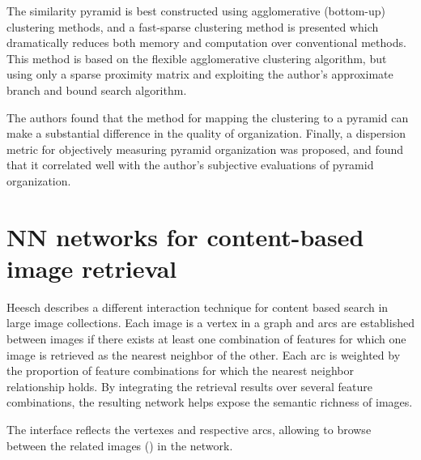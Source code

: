 The similarity pyramid is best constructed using agglomerative (bottom-up) clustering methods, and a fast-sparse clustering method is presented which dramatically reduces both memory and computation over conventional methods. This method is based on the flexible agglomerative clustering algorithm, but using only a sparse proximity matrix and exploiting the author's approximate branch and bound search algorithm.

The authors found that the method for mapping the clustering to a pyramid can make a substantial difference in the quality of organization. Finally, a dispersion metric for objectively measuring pyramid organization was proposed, and found that it correlated well with the author's subjective evaluations of pyramid organization.



\section{NN networks for content-based image retrieval} %
\label{sub:Heesch}

Heesch \cite{Heesch:2004p2675} describes a different interaction technique for content based search in large image collections. Each image is a vertex in a graph and arcs are established between images if there exists at least one combination of features for which one image is retrieved as the nearest neighbor of the other. Each arc is weighted by the proportion of feature combinations for which the nearest neighbor relationship holds. By integrating the retrieval results over several feature combinations, the resulting network helps expose the semantic richness of images.

The interface reflects the vertexes and respective arcs, allowing to browse between the related images () in the network.

